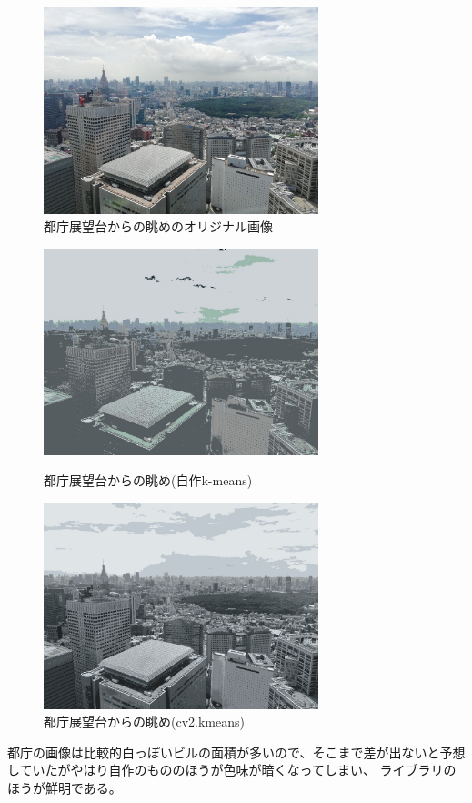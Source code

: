 \documentclass[11pt,a4j]{jsarticle}
\begin{document}
    \begin{figure}[H]
        \centering
        \includegraphics[clip,width=80mm]{img/metro.jpg}
        \caption{都庁展望台からの眺めのオリジナル画像\label{fig:metro}}
    \end{figure} 

    \begin{figure}[htbp]
        \begin{minipage}{0.5\hsize}
         \begin{center}
          \includegraphics[width=80mm]{img/metro_result.jpg}
         \end{center}
         \caption{都庁展望台からの眺め(自作k-means)}
        \end{minipage}
        \begin{minipage}{0.5\hsize}
         \begin{center}
          \includegraphics[width=80mm]{img/metro_opencv.jpg}
         \end{center}
         \caption{都庁展望台からの眺め(cv2.kmeans)}
        \end{minipage}
    \end{figure} 
    都庁の画像は比較的白っぽいビルの面積が多いので、そこまで差が出ないと予想していたがやはり自作のもののほうが色味が暗くなってしまい、
    ライブラリのほうが鮮明である。
\end{document}
